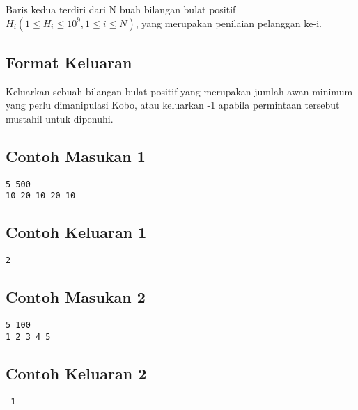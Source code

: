 \documentclass{article}
\begin{document}
Baris kedua terdiri dari N buah bilangan bulat positif $H_i (1 \leq H_i \leq 10^9, 1 \leq i \leq N)$, yang merupakan penilaian pelanggan ke-i.

\subsection*{Format Keluaran}

Keluarkan sebuah bilangan bulat positif yang merupakan jumlah awan minimum yang perlu dimanipulasi Kobo, atau keluarkan -1 apabila permintaan tersebut mustahil untuk dipenuhi.

\begin{multicols}{2}
\subsection*{Contoh Masukan 1}
\begin{lstlisting}
5 500
10 20 10 20 10
\end{lstlisting}
\columnbreak
\subsection*{Contoh Keluaran 1}
\begin{lstlisting}
2
\end{lstlisting}
\vfill
\null
\end{multicols}

\begin{multicols}{2}
\subsection*{Contoh Masukan 2}
\begin{lstlisting}
5 100
1 2 3 4 5
\end{lstlisting}
\columnbreak
\subsection*{Contoh Keluaran 2}
\begin{lstlisting}
-1
\end{lstlisting}
\vfill
\null
\end{multicols}
\end{document}
